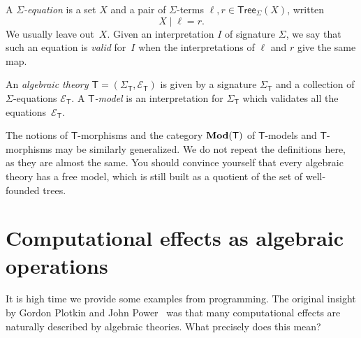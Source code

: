 \documentclass{amsart}
\newcommand{\theory}[1]{\mathsf{#1}} %
\newcommand{\signature}[1]{\Sigma_{\theory{#1}}} %
\newcommand{\equations}[1]{\mathcal{E}_{\theory{#1}}} %
\newcommand{\Mod}[1]{\text{\textbf{Mod}}(\theory{#1})} %
\newcommand{\Tree}[2]{\mathsf{Tree}_{#1}(#2)} %
\begin{document}
A \emph{$\Sigma$-equation} is a set $X$ and a pair of $\Sigma$-terms
$\ell, r \in \Tree{\Sigma}{X}$, written
%
\begin{equation*}
  X \mid \ell = r.
\end{equation*}
%
We usually leave out~$X$. Given an interpretation $I$ of signature $\Sigma$, we
say that such an equation is \emph{valid} for~$I$ when the interpretations of
$\ell$ and $r$ give the same map.

An \emph{algebraic theory $\theory{T} = (\signature{T}, \equations{T})$} is
given by a signature $\signature{T}$ and a collection of $\Sigma$-equations
$\equations{T}$. A \emph{$\theory{T}$-model} is an interpretation for
$\signature{T}$ which validates all the equations~$\equations{T}$.

The notions of $\theory{T}$-morphisms and the category $\Mod{T}$ of
$\theory{T}$-models and $\theory{T}$-morphisms may be similarly generalized. We
do not repeat the definitions here, as they are almost the same. You should
convince yourself that every algebraic theory has a free model, which is still
built as a quotient of the set of well-founded trees.

\section{Computational effects as algebraic operations}
\label{sec:comp-effects-as}

It is high time we provide some examples from programming. The original insight
by Gordon Plotkin and John
Power~\cite{plotkin01:_seman_algeb_operat,plotkin03:_algeb_operat_gener_effec}
was that many computational effects are naturally described by algebraic
theories. What precisely does this mean?
\end{document}
